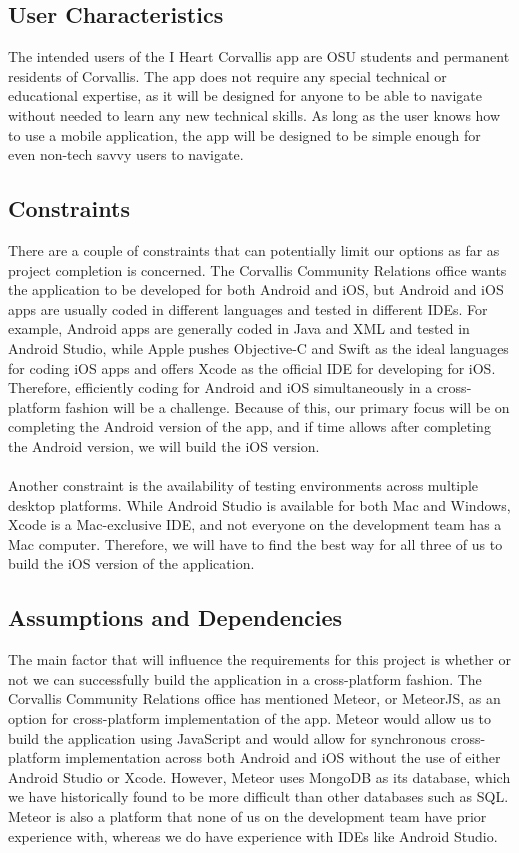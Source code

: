 \documentclass[draftclsnofoot, onecolumn, 10pt, compsoc]{IEEEtran}
\begin{document}
		\subsection{User Characteristics}
			The intended users of the I Heart Corvallis app are OSU students and permanent residents of Corvallis. The app does not require any special technical or educational expertise, as it will be designed for anyone to be able to navigate without needed to learn any new technical skills. As long as the user knows how to use a mobile application, the app will be designed to be simple enough for even non-tech savvy users to navigate.
		
		\subsection{Constraints}
			There are a couple of constraints that can potentially limit our options as far as project completion is concerned. The Corvallis Community Relations office wants the application to be developed for both Android and iOS, but Android and iOS apps are usually coded in different languages and tested in different IDEs. For example, Android apps are generally coded in Java and XML and tested in Android Studio, while Apple pushes Objective-C and Swift as the ideal languages for coding iOS apps and offers Xcode as the official IDE for developing for iOS. Therefore, efficiently coding for Android and iOS simultaneously in a cross-platform fashion will be a challenge. Because of this, our primary focus will be on completing the Android version of the app, and if time allows after completing the Android version, we will build the iOS version. \\ \\
			Another constraint is the availability of testing environments across multiple desktop platforms. While Android Studio is available for both Mac and Windows, Xcode is a Mac-exclusive IDE, and not everyone on the development team has a Mac computer. Therefore, we will have to find the best way for all three of us to build the iOS version of the application.
		
		\subsection{Assumptions and Dependencies}
			The main factor that will influence the requirements for this project is whether or not we can successfully build the application in a cross-platform fashion. The Corvallis Community Relations office has mentioned Meteor, or MeteorJS, as an option for cross-platform implementation of the app. Meteor would allow us to build the application using JavaScript and would allow for synchronous cross-platform implementation across both Android and iOS without the use of either Android Studio or Xcode. However, Meteor uses MongoDB as its database, which we have historically found to be more difficult than other databases such as SQL. Meteor is also a platform that none of us on the development team have prior experience with, whereas we do have experience with IDEs like Android Studio.
		
\end{document}
